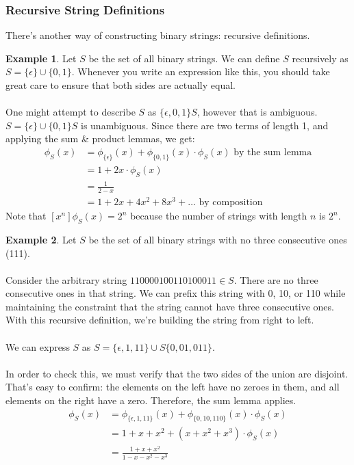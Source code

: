 \documentclass[]{article}
\theoremstyle{definition}
\newtheorem{ex}{Example}[section]
\newcommand{\lecture}[1]{\marginpar{{\footnotesize $\leftarrow$ \underline{#1}}}}
\begin{document}
			\subsubsection{Recursive String Definitions}
				There's another way of constructing binary strings: recursive definitions.
				\begin{ex} \lecture{February 1, 2013}
					Let $S$ be the set of all binary strings. We can define $S$ recursively as $S = \{ \epsilon \} \cup \{0, 1\}$. Whenever you write an expression like this, you should take great care to ensure that both sides are actually equal.
					\\ \\
					One might attempt to describe $S$ as $\{ \epsilon, 0, 1 \}S$, however that is ambiguous. $S = \{ \epsilon \} \cup \{ 0, 1 \} S$ is unambiguous. Since there are two terms of length 1, and applying the sum \& product lemmas, we get:
					\begin{align*}
						\phi_S(x) &= \phi_{\{\epsilon\}}(x) + \phi_{\{0, 1\}}(x) \cdot \phi_S(x) \text{ by the sum lemma} \\
						&= 1 + 2x \cdot \phi_S(x) \\
						&= \frac{1}{2 - x} \\
						&= 1 + 2x + 4x^2 + 8x^3 + \ldots \text{ by composition}
					\end{align*}
					Note that $[x^n]\phi_S(x) = 2^n$ because the number of strings with length $n$ is $2^n$.
				\end{ex}

				\begin{ex}
					Let $S$ be the set of all binary strings with no three consecutive ones (111).
					\\ \\
					Consider the arbitrary string $110000100110100011 \in S$. There are no three consecutive ones in that string. We can prefix this string with 0, 10, or 110 while maintaining the constraint that the string cannot have three consecutive ones. With this recursive definition, we're building the string from right to left.
					\\ \\
					We can express $S$ as $S = \{ \epsilon, 1, 11 \} \cup S\{0, 01, 011\}$.
					\\ \\
					In order to check this, we must verify that the two sides of the union are disjoint. That's easy to confirm: the elements on the left have no zeroes in them, and all elements on the right have a zero. Therefore, the sum lemma applies.
					\begin{align*}
						\phi_S(x) &= \phi_{\{\epsilon, 1, 11\}}(x) + \phi_{\{0, 10, 110\}}(x) \cdot \phi_S(x) \\
						&= 1 + x + x^2 + (x + x^2 + x^3) \cdot \phi_S(x) \\
						&= \frac{1 + x + x^2}{1 - x - x^2 - x^3}
					\end{align*}
				\end{ex}
\end{document}
